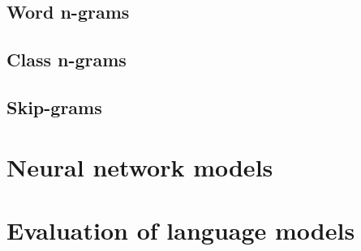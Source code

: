 \subsection{Word n-grams}

\subsection{Class n-grams}
\label{subsection:class}
\subsection{Skip-grams}

\section{Neural network models}
\label{section:ann}
\section{Evaluation of language models}
\label{section:evaluation}


